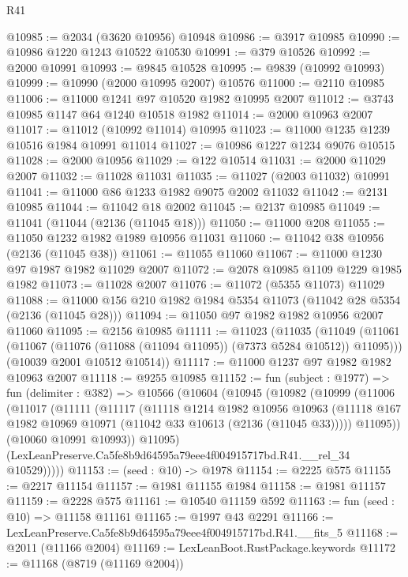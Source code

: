 \begin{lexlean}{R41}
\begin{coremodule}
@10985 := @2034 (@3620 @10956) @10948
@10986 := @3917 @10985
@10990 := @10986 @1220 @1243 @10522 @10530
@10991 := @379 @10526
@10992 := @2000 @10991
@10993 := @9845 @10528
@10995 := @9839 (@10992 @10993)
@10999 := @10990 (@2000 @10995 @2007) @10576
@11000 := @2110 @10985
@11006 := @11000 @1241 @97 @10520 @1982 @10995 @2007
@11012 := @3743 @10985 @1147 @64 @1240 @10518 @1982
@11014 := @2000 @10963 @2007
@11017 := @11012 (@10992 @11014) @10995
@11023 := @11000 @1235 @1239 @10516 @1984 @10991 @11014
@11027 := @10986 @1227 @1234 @9076 @10515
@11028 := @2000 @10956
@11029 := @122 @10514
@11031 := @2000 @11029 @2007
@11032 := @11028 @11031
@11035 := @11027 (@2003 @11032) @10991
@11041 := @11000 @86 @1233 @1982 @9075 @2002 @11032
@11042 := @2131 @10985
@11044 := @11042 @18 @2002
@11045 := @2137 @10985
@11049 := @11041 (@11044 (@2136 (@11045 @18)))
@11050 := @11000 @208
@11055 := @11050 @1232 @1982 @1989 @10956 @11031
@11060 := @11042 @38 @10956 (@2136 (@11045 @38))
@11061 := @11055 @11060
@11067 := @11000 @1230 @97 @1987 @1982 @11029 @2007
@11072 := @2078 @10985 @1109 @1229 @1985 @1982
@11073 := @11028 @2007
@11076 := @11072 (@5355 @11073) @11029
@11088 := @11000 @156 @210 @1982 @1984 @5354 @11073 (@11042 @28 @5354 (@2136 (@11045 @28)))
@11094 := @11050 @97 @1982 @1982 @10956 @2007 @11060
@11095 := @2156 @10985
@11111 := @11023
    (@11035
      (@11049 (@11061 (@11067 (@11076 (@11088 (@11094 @11095)) (@7373 @5284 @10512)) @11095)))
      (@10039 @2001 @10512 @10514))
@11117 := @11000 @1237 @97 @1982 @1982 @10963 @2007
@11118 := @9255 @10985
@11152 := fun (subject : @1977) =>
  fun (delimiter : @382) =>
  @10566
    (@10604
      (@10945
        (@10982
          (@10999
            (@11006
              (@11017
                (@11111
                  (@11117
                    (@11118
                      @1214
                      @1982
                      @10956
                      @10963
                      (@11118 @167 @1982 @10969 @10971 (@11042 @33 @10613 (@2136 (@11045 @33)))))
                    @11095))
                (@10060 @10991 @10993))
              @11095)
            (LexLeanPreserve.Ca5fe8b9d64595a79eee4f004915717bd.R41.__rel_34 @10529)))))
@11153 := (seed : @10) -> @1978
@11154 := @2225 @575
@11155 := @2217 @11154
@11157 := @1981 @11155 @1984
@11158 := @1981 @11157
@11159 := @2228 @575
@11161 := @10540 @11159 @592
@11163 := fun (seed : @10) => @11158 @11161
@11165 := @1997 @43 @2291
@11166 := LexLeanPreserve.Ca5fe8b9d64595a79eee4f004915717bd.R41.__fits_5
@11168 := @2011 (@11166 @2004)
@11169 := LexLeanBoot.RustPackage.keywords
@11172 := @11168 (@8719 (@11169 @2004))

\end{coremodule}
\end{lexlean}
